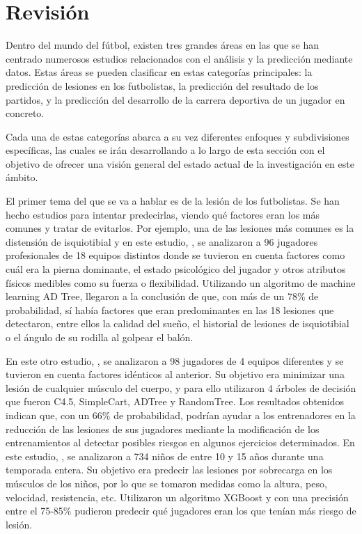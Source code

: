 \section{Revisión}

Dentro del mundo del fútbol, existen tres grandes áreas en las que se han centrado numerosos estudios relacionados con el análisis y la predicción mediante datos. Estas áreas se pueden clasificar en estas categorías principales: la predicción de lesiones en los futbolistas, la predicción del resultado de los partidos, y la predicción del desarrollo de la carrera deportiva de un jugador en concreto.

Cada una de estas categorías abarca a su vez diferentes enfoques y subdivisiones específicas, las cuales se irán desarrollando a lo largo de esta sección con el objetivo de ofrecer una visión general del estado actual de la investigación en este ámbito.

El primer tema del que se va a hablar es de la lesión de los futbolistas. Se han hecho estudios para intentar predecirlas, viendo qué factores eran los más comunes y tratar de evitarlos. Por ejemplo, una de las lesiones más comunes es la distensión de isquiotibial y en este estudio, \cite{first-injury}, se analizaron a 96 jugadores profesionales de 18 equipos distintos donde se tuvieron en cuenta factores como cuál era la pierna dominante, el estado psicológico del jugador y otros atributos físicos medibles como su fuerza o flexibilidad. Utilizando un algoritmo de machine learning AD Tree, llegaron a la conclusión de que, con más de un 78\% de probabilidad, sí había factores que eran predominantes en las 18 lesiones que detectaron, entre ellos la calidad del sueño, el historial de lesiones de isquiotibial o el ángulo de su rodilla al golpear el balón.

En este otro estudio, \cite{second-injury}, se analizaron a 98 jugadores de 4 equipos diferentes y se tuvieron en cuenta factores idénticos al anterior. Su objetivo era minimizar una lesión de cualquier músculo del cuerpo, y para ello utilizaron 4 árboles de decisión que fueron C4.5, SimpleCart, ADTree y RandomTree. Los resultados obtenidos indican que, con un 66\% de probabilidad, podrían ayudar  a los entrenadores en la reducción de las lesiones de sus jugadores mediante la modificación de los entrenamientos al detectar posibles riesgos en algunos ejercicios determinados. En este estudio, \cite{third-injury}, se analizaron a 734 niños de entre 10 y 15 años durante una temporada entera. Su objetivo era predecir las lesiones por sobrecarga en los músculos de los niños, por lo que se tomaron medidas como la altura, peso, velocidad, resistencia, etc. Utilizaron un algoritmo XGBoost y con una precisión entre el 75-85\% pudieron predecir qué jugadores eran los que tenían más riesgo de lesión.


